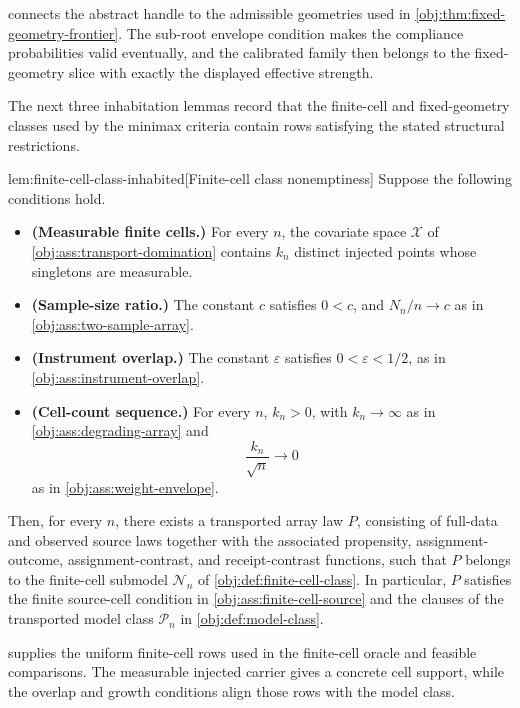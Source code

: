  connects the abstract handle to the admissible geometries used in \cref{obj:thm:fixed-geometry-frontier}. The sub-root envelope condition makes the compliance probabilities valid eventually, and the calibrated family then belongs to the fixed-geometry slice with exactly the displayed effective strength.

The next three inhabitation lemmas record that the finite-cell and fixed-geometry classes used by the minimax criteria contain rows satisfying the stated structural restrictions.

\begin{lemmav}{lem:finite-cell-class-inhabited}[Finite-cell class nonemptiness]
Suppose the following conditions hold.
\begin{itemize}
\item \textbf{(Measurable finite cells.)} For every \(n\), the covariate space \(\mathcal X\) of \cref{obj:ass:transport-domination} contains \(k_n\) distinct injected points whose singletons are measurable.
\item \textbf{(Sample-size ratio.)} The constant \(c\) satisfies \(0<c\), and \(N_n/n\to c\) as in \cref{obj:ass:two-sample-array}.
\item \textbf{(Instrument overlap.)} The constant \(\varepsilon\) satisfies \(0<\varepsilon<1/2\), as in \cref{obj:ass:instrument-overlap}.
\item \textbf{(Cell-count sequence.)} For every \(n\), \(k_n>0\), with \(k_n\to\infty\) as in \cref{obj:ass:degrading-array} and
\[
\frac{k_n}{\sqrt n}\to 0
\]
as in \cref{obj:ass:weight-envelope}.
\end{itemize}
Then, for every \(n\), there exists a transported array law \(P\), consisting of full-data and observed source laws together with the associated propensity, assignment-outcome, assignment-contrast, and receipt-contrast functions, such that \(P\) belongs to the finite-cell submodel \(\mathcal N_n\) of \cref{obj:def:finite-cell-class}. In particular, \(P\) satisfies the finite source-cell condition in \cref{obj:ass:finite-cell-source} and the clauses of the transported model class \(\mathcal P_n\) in \cref{obj:def:model-class}.
\end{lemmav}

 supplies the uniform finite-cell rows used in the finite-cell oracle and feasible comparisons. The measurable injected carrier gives a concrete cell support, while the overlap and growth conditions align those rows with the model class.

